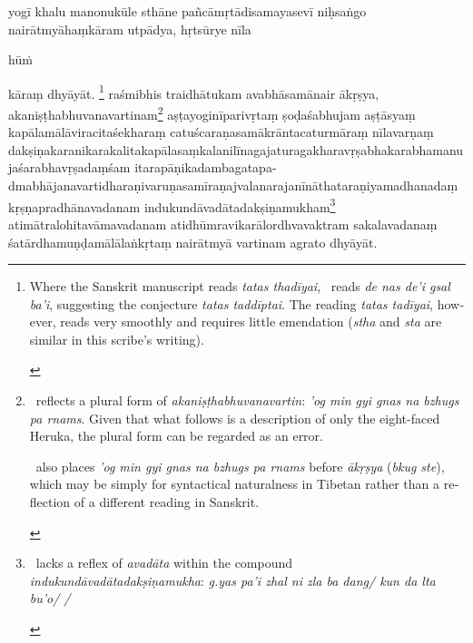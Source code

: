 \documentclass[naipra.tex]{subfiles}
\begin{document}
\begin{sanskrit}

\medskip\pstart
yogī khalu  manonukūle sthāne pañcāmṛtādisamayasevī  niḥsaṅgo   nairātmyāhaṃkāram utpādya, hṛtsūrye nīla\dsh \begin{mantra}hūṁ\end{mantra}\dsh kāraṃ dhyāyāt. 
\footnote{
	\begin{english}%
		Where the Sanskrit manuscript reads \emph{tatas thadīyai}, \TIB\ reads \emph{de nas de'i gsal ba'i}, suggesting the conjecture \emph{tatas taddīptai}.
		The reading \emph{tatas tadīyai}, however, reads very smoothly and requires little emendation (\emph{stha} and \emph{sta} are similar in this scribe's writing).
	\end{english}
} raśmibhis traidhātukam avabhāsamānair ākṛṣya, akaniṣṭhabhuvanavartinam\footnote{
	\begin{english}%
		\TIB\ reflects a plural form of \emph{akaniṣṭhabhuvanavartin}: \emph{'og min gyi gnas na bzhugs pa rnams}.
		Given that what follows is a description of only the eight-faced Heruka, the plural form can be regarded as an error.

		\TIB\ also places \emph{'og min gyi gnas na bzhugs pa rnams} before \emph{ākṛṣya} (\emph{bkug ste}), which may be simply for syntactical naturalness in Tibetan rather than a reflection of a different reading in Sanskrit.
	\end{english}
} aṣṭayoginīparivṛtaṃ ṣoḍaśabhujam aṣṭāsyaṃ kapālamālāviracitaśekharaṃ catuścaraṇasamākrāntacaturmāraṃ nīlavarṇaṃ dakṣiṇakaranikarakalitakapālasaṃkalanilīnagaja\dsh turaga\dsh khara\dsh vṛṣabha\dsh karabha\dsh manuja\dsh śarabha\dsh vṛṣadaṃśam itarapāṇikadambagatapa-\\ dmabhājanavartidharaṇi\dsh varuṇa\dsh samīraṇa\dsh jvalana\dsh rajanīnātha\dsh taraṇi\dsh yama\dsh dhanadaṃ kṛṣṇapradhānavadanam indukundāvadātadakṣiṇamukham\footnote{
	\begin{english}%
		\TIB\ lacks a reflex of \emph{avadāta} within the compound \emph{indukundāvadātadakṣiṇamukha}: \emph{g.yas pa'i zhal ni zla ba dang/ kun da lta bu'o/ /}
	\end{english}
} atimātralohitavāmavadanam atidhūmravikarālordhvavaktram sakalavadanaṃ śatārdhamuṇḍamālālaṅkṛtaṃ nairātmyā vartinam agrato dhyāyāt. 
\pend


\end{sanskrit}
\end{document}
